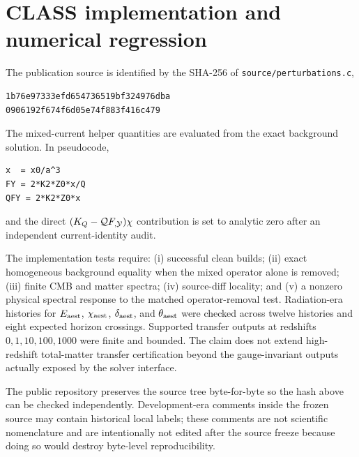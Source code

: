 \section{CLASS implementation and numerical regression}\label{app:class}
The publication source is identified by the SHA-256 of \texttt{source/perturbations.c},
\begin{verbatim}
1b76e97333efd654736519bf324976dba
0906192f674f6d05e74f883f416c479
\end{verbatim}
The mixed-current helper quantities are evaluated from the exact background solution. In pseudocode,
\begin{verbatim}
x  = x0/a^3
FY = 2*K2*Z0*x/Q
QFY = 2*K2*Z0*x
\end{verbatim}
and the direct $(K_Q-\mathcal{Q} F_{,\mathcal{Y}})\chi$ contribution is set to analytic zero after an independent current-identity audit.

The implementation tests require: (i) successful clean builds; (ii) exact homogeneous background equality when the mixed operator alone is removed; (iii) finite CMB and matter spectra; (iv) source-diff locality; and (v) a nonzero physical spectral response to the matched operator-removal test. Radiation-era histories for $E_{\rm aest}$, $\chi_{\rm aest}$, $\delta_{\rm aest}$, and $\theta_{\rm aest}$ were checked across twelve histories and eight expected horizon crossings. Supported transfer outputs at redshifts $0,1,10,100,1000$ were finite and bounded. The claim does not extend high-redshift total-matter transfer certification beyond the gauge-invariant outputs actually exposed by the solver interface.

The public repository preserves the source tree byte-for-byte so the hash above can be checked independently. Development-era comments inside the frozen source may contain historical local labels; these comments are not scientific nomenclature and are intentionally not edited after the source freeze because doing so would destroy byte-level reproducibility.
